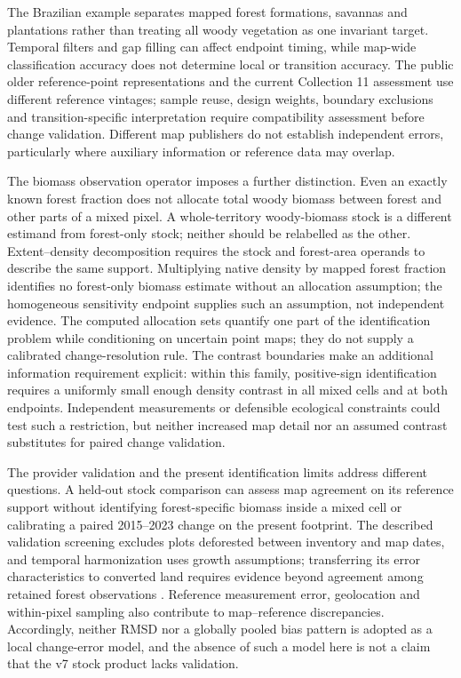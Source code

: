 \documentclass[11pt,a4paper]{article}
\begin{document}
The Brazilian example separates mapped forest formations, savannas and plantations rather than treating all woody vegetation as one invariant target. Temporal filters and gap filling can affect endpoint timing, while map-wide classification accuracy does not determine local or transition accuracy. The public older reference-point representations and the current Collection 11 assessment use different reference vintages; sample reuse, design weights, boundary exclusions and transition-specific interpretation require compatibility assessment before change validation. Different map publishers do not establish independent errors, particularly where auxiliary information or reference data may overlap.

The biomass observation operator imposes a further distinction. Even an exactly known forest fraction does not allocate total woody biomass between forest and other parts of a mixed pixel. A whole-territory woody-biomass stock is a different estimand from forest-only stock; neither should be relabelled as the other. Extent--density decomposition requires the stock and forest-area operands to describe the same support. Multiplying native density by mapped forest fraction identifies no forest-only biomass estimate without an allocation assumption; the homogeneous sensitivity endpoint supplies such an assumption, not independent evidence. The computed allocation sets quantify one part of the identification problem while conditioning on uncertain point maps; they do not supply a calibrated change-resolution rule. The contrast boundaries make an additional information requirement explicit: within this family, positive-sign identification requires a uniformly small enough density contrast in all mixed cells and at both endpoints. Independent measurements or defensible ecological constraints could test such a restriction, but neither increased map detail nor an assumed contrast substitutes for paired change validation.

The provider validation and the present identification limits address different questions. A held-out stock comparison can assess map agreement on its reference support without identifying forest-specific biomass inside a mixed cell or calibrating a paired 2015--2023 change on the present footprint. The described validation screening excludes plots deforested between inventory and map dates, and temporal harmonization uses growth assumptions; transferring its error characteristics to converted land requires evidence beyond agreement among retained forest observations \citep[pp.~13, 18--19]{PVIR2026}. Reference measurement error, geolocation and within-pixel sampling also contribute to map--reference discrepancies. Accordingly, neither RMSD nor a globally pooled bias pattern is adopted as a local change-error model, and the absence of such a model here is not a claim that the v7 stock product lacks validation.
\end{document}
